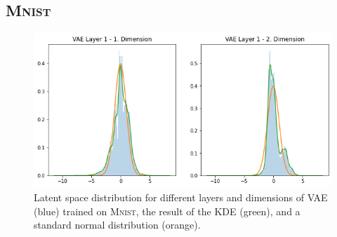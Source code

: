 \subsection{\textsc{Mnist}}\label{subsec:appendix_pixel_wise_statistics_mnist}
\begin{figure}[H]
    \centering
    \includegraphics[width=\textwidth]{images/generated_vs_true/mnist/vae_kde.png}
    \caption[\ac{VAE} on \textsc{Mnist}: Estimated Latent Space Distribution]{Latent space distribution for different layers and dimensions of \ac{VAE} (blue) trained on \textsc{Mnist}, the result of the \ac{KDE} (green), and a standard normal distribution (orange).}
\end{figure}


